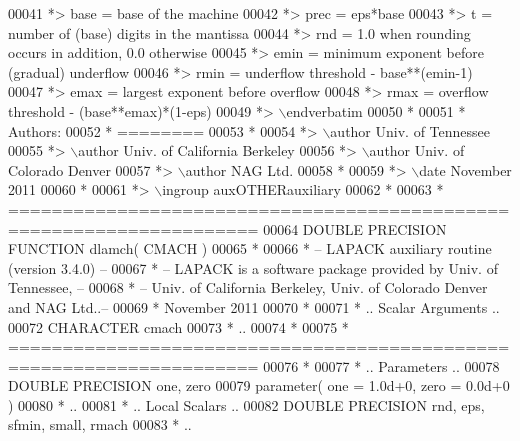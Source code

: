 \begin{DoxyCode}
00041 \textcolor{comment}{*>          base  = base of the machine}
00042 \textcolor{comment}{*>          prec  = eps*base}
00043 \textcolor{comment}{*>          t     = number of (base) digits in the mantissa}
00044 \textcolor{comment}{*>          rnd   = 1.0 when rounding occurs in addition, 0.0 otherwise}
00045 \textcolor{comment}{*>          emin  = minimum exponent before (gradual) underflow}
00046 \textcolor{comment}{*>          rmin  = underflow threshold - base**(emin-1)}
00047 \textcolor{comment}{*>          emax  = largest exponent before overflow}
00048 \textcolor{comment}{*>          rmax  = overflow threshold  - (base**emax)*(1-eps)}
00049 \textcolor{comment}{*> \(\backslash\)endverbatim}
00050 \textcolor{comment}{*}
00051 \textcolor{comment}{*  Authors:}
00052 \textcolor{comment}{*  ========}
00053 \textcolor{comment}{*}
00054 \textcolor{comment}{*> \(\backslash\)author Univ. of Tennessee }
00055 \textcolor{comment}{*> \(\backslash\)author Univ. of California Berkeley }
00056 \textcolor{comment}{*> \(\backslash\)author Univ. of Colorado Denver }
00057 \textcolor{comment}{*> \(\backslash\)author NAG Ltd. }
00058 \textcolor{comment}{*}
00059 \textcolor{comment}{*> \(\backslash\)date November 2011}
00060 \textcolor{comment}{*}
00061 \textcolor{comment}{*> \(\backslash\)ingroup auxOTHERauxiliary}
00062 \textcolor{comment}{*}
00063 \textcolor{comment}{*  =====================================================================}
00064 \textcolor{keyword}{      DOUBLE PRECISION }\textcolor{keyword}{FUNCTION }dlamch( CMACH )
00065 \textcolor{comment}{*}
00066 \textcolor{comment}{*  -- LAPACK auxiliary routine (version 3.4.0) --}
00067 \textcolor{comment}{*  -- LAPACK is a software package provided by Univ. of Tennessee,    --}
00068 \textcolor{comment}{*  -- Univ. of California Berkeley, Univ. of Colorado Denver and NAG Ltd..--}
00069 \textcolor{comment}{*     November 2011}
00070 \textcolor{comment}{*}
00071 \textcolor{comment}{*     .. Scalar Arguments ..}
00072       \textcolor{keywordtype}{CHARACTER}          cmach
00073 \textcolor{comment}{*     ..}
00074 \textcolor{comment}{*}
00075 \textcolor{comment}{* =====================================================================}
00076 \textcolor{comment}{*}
00077 \textcolor{comment}{*     .. Parameters ..}
00078       \textcolor{keywordtype}{DOUBLE PRECISION}   one, zero
00079       parameter( one = 1.0d+0, zero = 0.0d+0 )
00080 \textcolor{comment}{*     ..}
00081 \textcolor{comment}{*     .. Local Scalars ..}
00082       \textcolor{keywordtype}{DOUBLE PRECISION}   rnd, eps, sfmin, small, rmach
00083 \textcolor{comment}{*     ..}

\end{DoxyCode}
